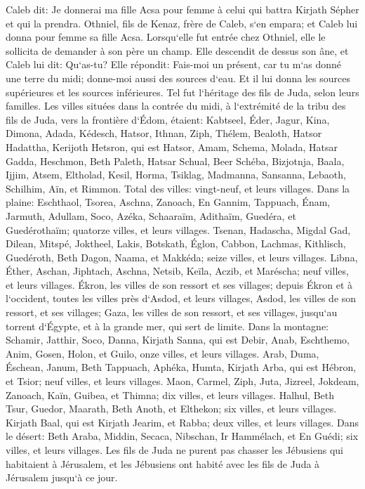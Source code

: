 \verse Caleb dit: Je donnerai ma fille Acsa pour femme à celui qui battra Kirjath Sépher et qui la prendra. 
\verse Othniel, fils de Kenaz, frère de Caleb, s`en empara; et Caleb lui donna pour femme sa fille Acsa. 
\verse Lorsqu`elle fut entrée chez Othniel, elle le sollicita de demander à son père un champ. Elle descendit de dessus son âne, et Caleb lui dit: Qu`as-tu? 
\verse Elle répondit: Fais-moi un présent, car tu m`as donné une terre du midi; donne-moi aussi des sources d`eau. Et il lui donna les sources supérieures et les sources inférieures. 
\verse Tel fut l`héritage des fils de Juda, selon leurs familles. 
\verse Les villes situées dans la contrée du midi, à l`extrémité de la tribu des fils de Juda, vers la frontière d`Édom, étaient: Kabtseel, Éder, Jagur, 
\verse Kina, Dimona, Adada, 
\verse Kédesch, Hatsor, Ithnan, 
\verse Ziph, Thélem, Bealoth, 
\verse Hatsor Hadattha, Kerijoth Hetsron, qui est Hatsor, 
\verse Amam, Schema, Molada, 
\verse Hatsar Gadda, Heschmon, Beth Paleth, 
\verse Hatsar Schual, Beer Schéba, Bizjotnja, 
\verse Baala, Ijjim, Atsem, 
\verse Eltholad, Kesil, Horma, 
\verse Tsiklag, Madmanna, Sansanna, 
\verse Lebaoth, Schilhim, Aïn, et Rimmon. Total des villes: vingt-neuf, et leurs villages. 
\verse Dans la plaine: Eschthaol, Tsorea, Aschna, 
\verse Zanoach, En Gannim, Tappuach, Énam, 
\verse Jarmuth, Adullam, Soco, Azéka, 
\verse Schaaraïm, Adithaïm, Guedéra, et Guedérothaïm; quatorze villes, et leurs villages. 
\verse Tsenan, Hadascha, Migdal Gad, 
\verse Dilean, Mitspé, Joktheel, 
\verse Lakis, Botskath, Églon, 
\verse Cabbon, Lachmas, Kithlisch, 
\verse Guedéroth, Beth Dagon, Naama, et Makkéda; seize villes, et leurs villages. 
\verse Libna, Éther, Aschan, 
\verse Jiphtach, Aschna, Netsib, 
\verse Keïla, Aczib, et Maréscha; neuf villes, et leurs villages. 
\verse Ékron, les villes de son ressort et ses villages; 
\verse depuis Ékron et à l`occident, toutes les villes près d`Asdod, et leurs villages, 
\verse Asdod, les villes de son ressort, et ses villages; Gaza, les villes de son ressort, et ses villages, jusqu`au torrent d`Égypte, et à la grande mer, qui sert de limite. 
\verse Dans la montagne: Schamir, Jatthir, Soco, 
\verse Danna, Kirjath Sanna, qui est Debir, 
\verse Anab, Eschthemo, Anim, 
\verse Gosen, Holon, et Guilo, onze villes, et leurs villages. 
\verse Arab, Duma, Éschean, 
\verse Janum, Beth Tappuach, Aphéka, 
\verse Humta, Kirjath Arba, qui est Hébron, et Tsior; neuf villes, et leurs villages. 
\verse Maon, Carmel, Ziph, Juta, 
\verse Jizreel, Jokdeam, Zanoach, 
\verse Kaïn, Guibea, et Thimna; dix villes, et leurs villages. 
\verse Halhul, Beth Tsur, Guedor, 
\verse Maarath, Beth Anoth, et Elthekon; six villes, et leurs villages. 
\verse Kirjath Baal, qui est Kirjath Jearim, et Rabba; deux villes, et leurs villages. 
\verse Dans le désert: Beth Araba, Middin, Secaca, 
\verse Nibschan, Ir Hammélach, et En Guédi; six villes, et leurs villages. 
\verse Les fils de Juda ne purent pas chasser les Jébusiens qui habitaient à Jérusalem, et les Jébusiens ont habité avec les fils de Juda à Jérusalem jusqu`à ce jour. 

